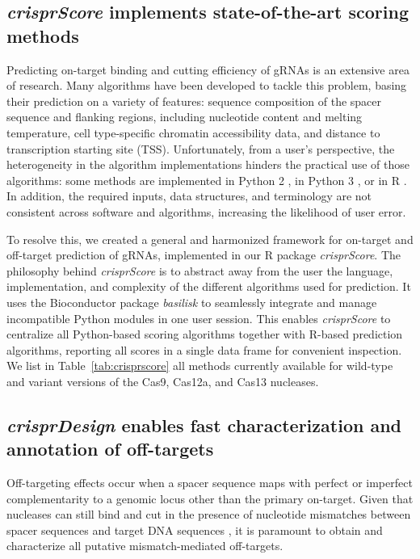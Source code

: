 \documentclass[pdftex,english,10pt]{article}
\begin{document}
\subsection{\textit{crisprScore} implements state-of-the-art scoring methods}

Predicting on-target binding and cutting efficiency of gRNAs is an extensive area of research. Many algorithms have been developed to tackle this problem, basing their prediction on a variety of features: sequence composition of the spacer sequence and flanking regions, including nucleotide content and melting temperature, cell type-specific chromatin accessibility data, and distance to transcription starting site (TSS).  Unfortunately, from a user's perspective, the heterogeneity in the algorithm implementations hinders the practical use of those algorithms: some methods are implemented in Python 2 \citep{azimuth,deepcpf1}, in Python 3 \citep{lindel,deepcas9,enpamgb}, or in R  \citep{doench2014rational,wessels2020massively,crisprscan}. In addition, the required inputs, data structures, and terminology are not consistent across software and algorithms, increasing the likelihood of user error.

To resolve this, we created a general and harmonized framework for on-target and off-target prediction of gRNAs, implemented in our R package \textit{crisprScore}. The philosophy behind \textit{crisprScore} is to abstract away from the user the language, implementation, and complexity of the different algorithms used for prediction.  It uses the Bioconductor package \textit{basilisk} \citep{basilisk} to seamlessly integrate and manage incompatible Python modules in one user session. This enables \textit{crisprScore} to centralize all Python-based scoring algorithms together with R-based prediction algorithms, reporting all scores in a single data frame for convenient inspection.
We list in Table~\ref{tab:crisprscore} all methods currently available for wild-type and variant versions of the Cas9, Cas12a, and Cas13 nucleases.


\subsection{\textit{crisprDesign} enables fast characterization and annotation of off-targets}

Off-targeting effects occur when a spacer sequence maps with
perfect or imperfect complementarity to a genomic locus other than the primary on-target.
Given that nucleases can still bind and cut in the presence of nucleotide mismatches between spacer sequences and target DNA sequences \citep{offtarget1,offtarget2,offtarget3}, it is paramount to obtain and characterize all putative mismatch-mediated off-targets.
\end{document}
